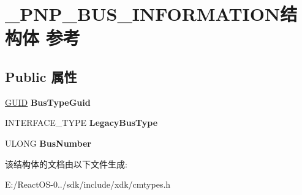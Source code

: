 \hypertarget{struct___p_n_p___b_u_s___i_n_f_o_r_m_a_t_i_o_n}{}\section{\+\_\+\+P\+N\+P\+\_\+\+B\+U\+S\+\_\+\+I\+N\+F\+O\+R\+M\+A\+T\+I\+O\+N结构体 参考}
\label{struct___p_n_p___b_u_s___i_n_f_o_r_m_a_t_i_o_n}
\subsection*{Public 属性}
\begin{DoxyCompactItemize}
\item 
\mbox{\label{struct___p_n_p___b_u_s___i_n_f_o_r_m_a_t_i_o_n_a81a2b7bfded7a6e573dd456b601443d3}} 
\hyperlink{interface_g_u_i_d}{G\+U\+ID} {\bfseries Bus\+Type\+Guid}
\item 
\mbox{\label{struct___p_n_p___b_u_s___i_n_f_o_r_m_a_t_i_o_n_a9bd9007132268b65034fa786091306f9}} 
I\+N\+T\+E\+R\+F\+A\+C\+E\+\_\+\+T\+Y\+PE {\bfseries Legacy\+Bus\+Type}
\item 
\mbox{\label{struct___p_n_p___b_u_s___i_n_f_o_r_m_a_t_i_o_n_aad84d7115d47a480f19db5a673e49b9e}} 
U\+L\+O\+NG {\bfseries Bus\+Number}
\end{DoxyCompactItemize}


该结构体的文档由以下文件生成\+:\begin{DoxyCompactItemize}
\item 
E\+:/\+React\+O\+S-\/0../sdk/include/xdk/cmtypes.\+h\end{DoxyCompactItemize}
